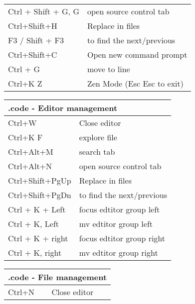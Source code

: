 \documentclass{article}
\begin{document}
\begin{landscape}
\begin{multicols*}{3}
\begin{tabular}{m{3cm}m{5cm}}
            Ctrl + Shift + G, G & open source control tab        \\
            Ctrl+Shift+H        & Replace in files               \\
            \rowcolor{LightCyan}
            F3 / Shift + F3     & to find the next/previous      \\
            Ctrl+Shift+C        & Open new command prompt        \\
            \rowcolor{LightCyan}
            Ctrl + G            & move to line                   \\
            Ctrl+K Z            & Zen Mode (Esc Esc to exit)
        \end{tabular}
        \vspace{5pt}
        \begin{tabular}{m{3cm}m{5cm}}
            \multicolumn{2}{l}{\textbf{.code - Editor management  }} \\
            \hline
            Ctrl+W           & Close editor                          \\
            \rowcolor{LightCyan}
            Ctrl+K F         & explore file                          \\
            Ctrl+Alt+M       & search tab                            \\
            \rowcolor{LightCyan}
            Ctrl+Alt+N       & open source control tab               \\
            Ctrl+Shift+PgUp  & Replace in files                      \\
            \rowcolor{LightCyan}
            Ctrl+Shift+PgDn  & to find the next/previous             \\
            Ctrl + K + Left  & focus edtitor group left              \\
            \rowcolor{LightCyan}
            Ctrl + K, Left   & mv edtitor group left                 \\
            Ctrl + K + right & focus edtitor group right             \\
            \rowcolor{LightCyan}
            Ctrl + K, right  & mv edtitor group right
        \end{tabular}
        \vspace{5pt}
        \begin{tabular}{m{3cm}m{5cm}}
            \multicolumn{2}{l}{\textbf{.code - File management   } } \\
            \hline
            Ctrl+N         & Close editor                            \\

\end{tabular}
\end{multicols*}
\end{landscape}
\end{document}
